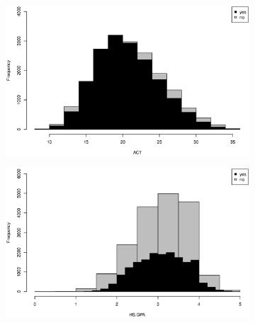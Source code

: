 \documentclass[12pt,english]{report}
\begin{document}
\begin{figure}[p]
\medskip
\begin{subfigure}{0.48\textwidth}
\includegraphics[width=\linewidth] {pic/enroll_act}
\caption{} \label{enroll:c}
\end{subfigure}\hspace*{\fill}
\begin{subfigure}{0.48\textwidth}
\includegraphics[width=\linewidth]{pic/enroll_gpa}
\caption{} \label{enroll:d}
\end{subfigure}


\end{figure}
\end{document}
